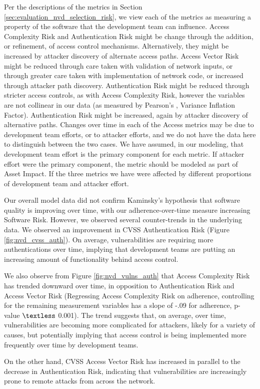 Per the descriptions of the metrics in Section \ref{sec:evaluation_nvd_selection_risk}, we view each of the metrics as measuring a property of the software that the development team can influence. Access Complexity Risk and Authentication Risk might be change through the addition, or refinement, of access control mechanisms. Alternatively, they might be increased by attacker discovery of alternate access paths.   Access Vector Risk might be reduced through care taken with validation of network inputs, or through greater care taken with implementation of network code, or increased through attacker path discovery. Authentication Risk might be reduced through stricter access controls, as with Access Complexity Risk, however the variables are not collinear in our data (as measured by Pearson's , Variance Inflation Factor). Authentication Risk might be increased, again by attacker discovery of alternative paths. Changes over time in each of the Access metrics may be due to development team efforts, or to attacker efforts, and we do not have the data here to distinguish between the two cases. We have assumed, in our modeling, that development team effort is the primary component for each metric. If attacker effort were the primary component, the metric should be modeled as part of Asset Impact.  If the three metrics we have were affected by different proportions of development team and attacker effort.

Our overall model data did not confirm Kaminsky's hypothesis that software quality is improving over time, with our adherence-over-time measure increasing Software Risk. However, we observed several counter-trends in the underlying data. We observed an improvement in CVSS Authentication Risk (Figure \ref{fig:nvd_cvss_auth}). On average, vulnerabilities are requiring more authentications over time, implying that development teams are putting an increasing amount of functionality behind access control.

We also observe from Figure \ref{fig:nvd_vulns_auth} that Access Complexity Risk has trended downward over time, in opposition to Authentication Risk and Access Vector Risk (Regressing Access Complexity Risk on adherence, controlling for the remaining measurement variables has a slope of -.09 for adherence, p-value $\textless$ 0.001). The trend suggests that, on average, over time, vulnerabilities are becoming more complicated for attackers, likely for a variety of causes, but potentially implying that access control is being implemented more frequently over time by development teams.

On the other hand, CVSS Access Vector Risk has increased in parallel to the decrease in Authentication Risk, indicating that vulnerabilities are increasingly prone to remote attacks from across the network.